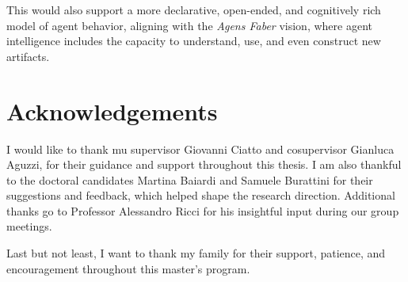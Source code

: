 \documentclass[12pt,a4paper,openright,twoside]{book}
\begin{document}
This would also support a more declarative, open-ended, and cognitively rich model of agent behavior, aligning with the \textit{Agens Faber} vision, where agent intelligence includes the capacity to understand, use, and even construct new artifacts.

\chapter*{Acknowledgements}

I would like to thank mu supervisor Giovanni Ciatto and cosupervisor Gianluca Aguzzi, for their guidance and support throughout this thesis.
%
I am also thankful to the doctoral candidates Martina Baiardi and Samuele Burattini for their suggestions and feedback, which helped shape the research direction.
%
Additional thanks go to Professor Alessandro Ricci for his insightful input during our group meetings.

Last but not least, I want to thank my family for their support, patience, and encouragement throughout this master's program.


\backmatter%
\printbibliography[heading=bibintoc]%
\end{document}
